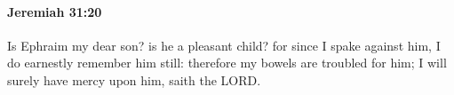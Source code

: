
		\paragraph{Jeremiah 31:20} %
			\label{JEREMIAH-31-20}

			Is Ephraim my dear son? is he a pleasant child? for since I spake against him, I do earnestly remember him still: therefore my bowels are troubled for him; I will surely have mercy upon him, saith the LORD.


